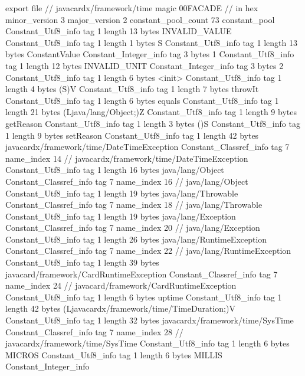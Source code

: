export file {		// javacardx/framework/time
	magic	00FACADE		 // in hex
	minor_version	3
	major_version	2
	constant_pool_count	73
	constant_pool {
		Constant_Utf8_info {
			tag	1
			length	13
			bytes	INVALID_VALUE
		}
		Constant_Utf8_info {
			tag	1
			length	1
			bytes	S
		}
		Constant_Utf8_info {
			tag	1
			length	13
			bytes	ConstantValue
		}
		Constant_Integer_info {
			tag	3
			bytes	1
		}
		Constant_Utf8_info {
			tag	1
			length	12
			bytes	INVALID_UNIT
		}
		Constant_Integer_info {
			tag	3
			bytes	2
		}
		Constant_Utf8_info {
			tag	1
			length	6
			bytes	<init>
		}
		Constant_Utf8_info {
			tag	1
			length	4
			bytes	(S)V
		}
		Constant_Utf8_info {
			tag	1
			length	7
			bytes	throwIt
		}
		Constant_Utf8_info {
			tag	1
			length	6
			bytes	equals
		}
		Constant_Utf8_info {
			tag	1
			length	21
			bytes	(Ljava/lang/Object;)Z
		}
		Constant_Utf8_info {
			tag	1
			length	9
			bytes	getReason
		}
		Constant_Utf8_info {
			tag	1
			length	3
			bytes	()S
		}
		Constant_Utf8_info {
			tag	1
			length	9
			bytes	setReason
		}
		Constant_Utf8_info {
			tag	1
			length	42
			bytes	javacardx/framework/time/DateTimeException
		}
		Constant_Classref_info {
			tag	7
			name_index	14		// javacardx/framework/time/DateTimeException
		}
		Constant_Utf8_info {
			tag	1
			length	16
			bytes	java/lang/Object
		}
		Constant_Classref_info {
			tag	7
			name_index	16		// java/lang/Object
		}
		Constant_Utf8_info {
			tag	1
			length	19
			bytes	java/lang/Throwable
		}
		Constant_Classref_info {
			tag	7
			name_index	18		// java/lang/Throwable
		}
		Constant_Utf8_info {
			tag	1
			length	19
			bytes	java/lang/Exception
		}
		Constant_Classref_info {
			tag	7
			name_index	20		// java/lang/Exception
		}
		Constant_Utf8_info {
			tag	1
			length	26
			bytes	java/lang/RuntimeException
		}
		Constant_Classref_info {
			tag	7
			name_index	22		// java/lang/RuntimeException
		}
		Constant_Utf8_info {
			tag	1
			length	39
			bytes	javacard/framework/CardRuntimeException
		}
		Constant_Classref_info {
			tag	7
			name_index	24		// javacard/framework/CardRuntimeException
		}
		Constant_Utf8_info {
			tag	1
			length	6
			bytes	uptime
		}
		Constant_Utf8_info {
			tag	1
			length	42
			bytes	(Ljavacardx/framework/time/TimeDuration;)V
		}
		Constant_Utf8_info {
			tag	1
			length	32
			bytes	javacardx/framework/time/SysTime
		}
		Constant_Classref_info {
			tag	7
			name_index	28		// javacardx/framework/time/SysTime
		}
		Constant_Utf8_info {
			tag	1
			length	6
			bytes	MICROS
		}
		Constant_Utf8_info {
			tag	1
			length	6
			bytes	MILLIS
		}
		Constant_Integer_info {
}}}
